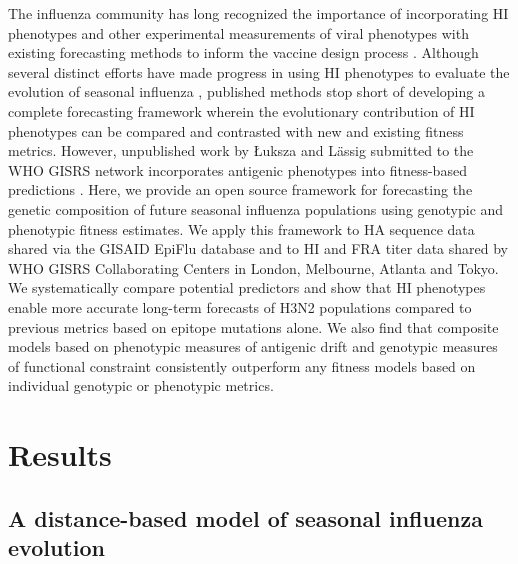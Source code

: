 The influenza community has long recognized the importance of incorporating HI phenotypes and other experimental measurements of viral phenotypes with existing forecasting methods to inform the vaccine design process \cite{Gandon:2016gz,Morris:2017ea,Lassig:2017hr}.
Although several distinct efforts have made progress in using HI phenotypes to evaluate the evolution of seasonal influenza \cite{Steinbruck:2014kq,Neher:2016hy}, published methods stop short of developing a complete forecasting framework wherein the evolutionary contribution of HI phenotypes can be compared and contrasted with new and existing fitness metrics.
However, unpublished work by {\L}uksza and L\"assig submitted to the WHO GISRS network incorporates antigenic phenotypes into fitness-based predictions \cite{Morris:2017ea,luksza_personal_communication}.
Here, we provide an open source framework for forecasting the genetic composition of future seasonal influenza populations using genotypic and phenotypic fitness estimates.
We apply this framework to HA sequence data shared via the GISAID EpiFlu database \cite{shu2017gisaid} and to HI and FRA titer data shared by WHO GISRS Collaborating Centers in London, Melbourne, Atlanta and Tokyo.
We systematically compare potential predictors and show that HI phenotypes enable more accurate long-term forecasts of H3N2 populations compared to previous metrics based on epitope mutations alone.
We also find that composite models based on phenotypic measures of antigenic drift and genotypic measures of functional constraint consistently outperform any fitness models based on individual genotypic or phenotypic metrics.

\section*{Results}

\subsection*{A distance-based model of seasonal influenza evolution}

